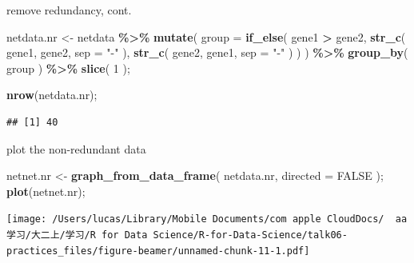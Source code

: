 \documentclass[ignorenonframetext,]{beamer}
\newenvironment{Shaded}{\begin{snugshade}}{\end{snugshade}}
\newcommand{\AttributeTok}[1]{\textcolor[rgb]{0.13,0.29,0.53}{#1}}
\newcommand{\ConstantTok}[1]{\textcolor[rgb]{0.56,0.35,0.01}{#1}}
\newcommand{\DecValTok}[1]{\textcolor[rgb]{0.00,0.00,0.81}{#1}}
\newcommand{\FunctionTok}[1]{\textcolor[rgb]{0.13,0.29,0.53}{\textbf{#1}}}
\newcommand{\NormalTok}[1]{#1}
\newcommand{\OtherTok}[1]{\textcolor[rgb]{0.56,0.35,0.01}{#1}}
\newcommand{\SpecialCharTok}[1]{\textcolor[rgb]{0.81,0.36,0.00}{\textbf{#1}}}
\newcommand{\StringTok}[1]{\textcolor[rgb]{0.31,0.60,0.02}{#1}}
\newcommand\FontSmall{\fontsize{7}{8}\selectfont}
\begin{document}
\begin{frame}[fragile]{remove redundancy, cont.}
\protect\hypertarget{remove-redundancy-cont.}{}
\FontSmall

\begin{Shaded}
\begin{Highlighting}[]
\NormalTok{netdata.nr }\OtherTok{\textless{}{-}} 
\NormalTok{  netdata }\SpecialCharTok{\%\textgreater{}\%} 
  \FunctionTok{mutate}\NormalTok{( }\AttributeTok{group  =}  
            \FunctionTok{if\_else}\NormalTok{( gene1 }\SpecialCharTok{\textgreater{}}\NormalTok{ gene2, }
                     \FunctionTok{str\_c}\NormalTok{( gene1, gene2, }\AttributeTok{sep =} \StringTok{"{-}"}\NormalTok{ ), }
                     \FunctionTok{str\_c}\NormalTok{( gene2, gene1, }\AttributeTok{sep =} \StringTok{"{-}"}\NormalTok{ ) ) ) }\SpecialCharTok{\%\textgreater{}\%} 
  \FunctionTok{group\_by}\NormalTok{( group ) }\SpecialCharTok{\%\textgreater{}\%} \FunctionTok{slice}\NormalTok{( }\DecValTok{1}\NormalTok{ );}

\FunctionTok{nrow}\NormalTok{(netdata.nr);}
\end{Highlighting}
\end{Shaded}

\begin{verbatim}
## [1] 40
\end{verbatim}
\end{frame}

\begin{frame}[fragile]{plot the non-redundant data}
\protect\hypertarget{plot-the-non-redundant-data}{}
\FontSmall

\begin{Shaded}
\begin{Highlighting}[]
\NormalTok{netnet.nr }\OtherTok{\textless{}{-}} \FunctionTok{graph\_from\_data\_frame}\NormalTok{( netdata.nr, }\AttributeTok{directed =} \ConstantTok{FALSE}\NormalTok{ );}
\FunctionTok{plot}\NormalTok{(netnet.nr);}
\end{Highlighting}
\end{Shaded}

\texttt{[image: /Users/lucas/Library/Mobile Documents/com~apple~CloudDocs/~~aa学习/大二上/学习/R for Data Science/R-for-Data-Science/talk06-practices\_files/figure-beamer/unnamed-chunk-11-1.pdf]}
\end{frame}
\end{document}
